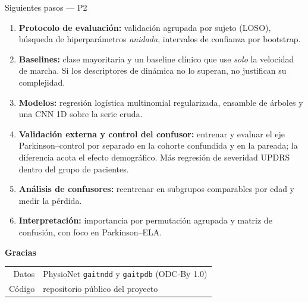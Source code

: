 \documentclass[aspectratio=169,10pt]{beamer}
\begin{document}
\begin{frame}{Siguientes pasos — P2}
  \begin{enumerate}
    \item \textbf{Protocolo de evaluación:} validación agrupada por sujeto (LOSO), búsqueda de hiperparámetros \emph{anidada}, intervalos de confianza por bootstrap.
      \vspace{0.5em}
    \item \textbf{Baselines:} clase mayoritaria y un baseline clínico que use \emph{solo} la velocidad de marcha. Si los descriptores de dinámica no lo superan, no justifican su complejidad.
      \vspace{0.5em}
    \item \textbf{Modelos:} regresión logística multinomial regularizada, ensamble de árboles y una CNN 1D sobre la serie cruda.
      \vspace{0.5em}
    \item \textbf{Validación externa y control del confusor:} entrenar y evaluar el eje Parkinson–control por separado en la cohorte confundida y en la pareada; la diferencia acota el efecto demográfico. Más regresión de severidad UPDRS dentro del grupo de pacientes.
      \vspace{0.5em}
    \item \textbf{Análisis de confusores:} reentrenar en subgrupos comparables por edad y medir la pérdida.
      \vspace{0.5em}
    \item \textbf{Interpretación:} importancia por permutación agrupada y matriz de confusión, con foco en Parkinson–ELA.
  \end{enumerate}
\end{frame}

\begin{frame}[plain]
  \vfill
  \centering
  {\Large\bfseries\color{structure} Gracias}

  \vspace{1.5em}
  \begin{tabular}{rl}
    Datos & PhysioNet \texttt{gaitndd} y \texttt{gaitpdb} (ODC-By 1.0) \\
    Código & repositorio público del proyecto \\
  \end{tabular}
  \vfill
\end{frame}
\end{document}
